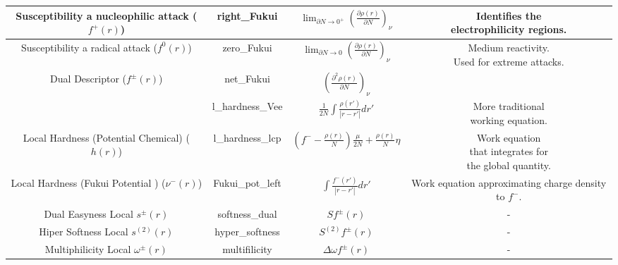 \documentclass[a4paper,11pt]{refart}
\begin{document}
\begin{minipage}{\fullwidth}
\begin{table}[H]
\begin{tabular}{c|c|c|c}
			\makecell{Susceptibility \\a nucleophilic attack\\ ($f^+(r)$)}&right\_Fukui&$\lim_{\partial N \to 0^+}\left(\frac{\partial \rho(r )}{\partial N} \right)_\nu$ & \makecell{Identifies the\\ electrophilicity regions.} \\ \hline
			\makecell{Susceptibility \\a radical attack \\($f^0(r)$)}&zero\_Fukui&$\lim_{\partial N \to 0}\left(\frac{\partial \rho(r)} {\partial N} \right)_\nu$ & \makecell{Medium reactivity.\\ Used for extreme attacks.} \\ \hline
			\makecell{Dual Descriptor \\($f^{\pm}(r)$)}&net\_Fukui &$\left(\frac{\partial ^2 \rho(r)}{\partial N} \right) _\nu$ & \makecell{Identifies the net trend.} \\ \hline
			\makecell{Local Hardness ($h(r)$)} &l\_hardness\_Vee &$\frac{1}{2N} \int \frac{\rho(r')}{|r-r'|} dr '$ & \makecell{More traditional\\working equation.} \\ \hline
			\makecell{Local Hardness \\(Potential\\ Chemical) ($h(r)$)} & l\_hardness\_lcp & $ \left (f^- - \frac{\rho(r)}{N} \right) \frac{\mu}{2N} + \frac{\rho(r)}{N}\eta$ & \makecell{Work equation\\ that integrates for\\the global quantity.} \\ \hline
			\makecell{Local Hardness \\(Fukui Potential\\) ($\nu^{-}(r)$)} & Fukui\_pot\_left & $\int \frac{f^{-}(r') }{|r - r'|}dr'$ & \makecell{Work equation\\ approximating charge \\density to $f^{-}$.} \\ \hline
			\makecell{Dual Easyness\\ Local $s^{\pm}(r)$} & softness\_dual & $Sf^{\pm}(r)$ & - \\ \hline
			\makecell{Hiper Softness\\Local $s^{(2)}(r)$ } & hyper\_softness & $S^{(2)}f^{\pm}(r)$ & - \\ \hline
			\makecell{Multiphilicity\\Local $ \omega^{\pm}(r)$} & multifilicity & $\Delta\omega f^{\pm}(r)$ & - \\
			\bottomrule
		\end{tabular}
		\label{tab_local1}
	\end{table}
\end{minipage}
\end{document}
